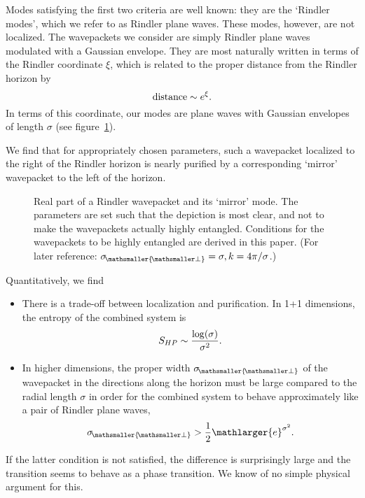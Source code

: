 \documentclass[11pt, a4paper]{article}
\newcommand{\si}{{\sigma}}
\let\perptmp\perp
\renewcommand{\perp}{{\! \mathsmaller{\perptmp}}}
\newcommand{\e}{\mathlarger{e}}
\begin{document}
Modes satisfying the first two criteria are well known: they are the `Rindler modes', which we refer to as Rindler plane waves. These modes, however, are not localized. The wavepackets we consider are simply Rindler plane waves modulated with a Gaussian envelope. They are most naturally written in terms of the Rindler coordinate $\xi$, which is related to the proper distance from the Rindler horizon by
\begin{equation*}
{\rm distance} \sim e^\xi.
\end{equation*}
In terms of this coordinate, our modes are plane waves with Gaussian envelopes of length $\si$ (see figure~\ref{fig:pairOfRindlerWavepackets}).

We find that for appropriately chosen parameters, such a wavepacket localized to the right of the Rindler horizon is nearly purified by a corresponding `mirror' wavepacket to the left of the horizon.

\begin{figure}[h]
	\centering
	\def\svgwidth{1\textwidth}
	\caption{Real part of a Rindler wavepacket and its `mirror' mode. The parameters are set such that the depiction is most clear, and not to make the wavepackets actually highly entangled. Conditions for the wavepackets to be highly entangled are derived in this paper. (For later reference: $\si_\perp=\si, k=4\pi/\si$.)  \label{fig:pairOfRindlerWavepackets}}
\end{figure}
Quantitatively, we find 
\begin{itemize}
	\item There is a trade-off between localization and purification. In 1+1 dimensions, the entropy of the combined system is
	\begin{equation}
	\label{eq:introSHP}
	S_{HP} \sim {\log(\sigma) \over \sigma^2}.
	\end{equation}
	\item In higher dimensions, the proper width $\si_\perp$ of the wavepacket  in the directions  along the horizon must be large compared to the radial length $\sigma$ in order for the combined system to behave approximately like a pair of Rindler plane waves,
	\begin{equation}
	\si_\perp > \frac{1}{2} \e^{\si^2}.
	\end{equation}
\end{itemize}
If the latter condition is not satisfied, the difference is surprisingly large and the transition seems to behave as a phase transition. We know of no simple physical argument for this.
\end{document}
